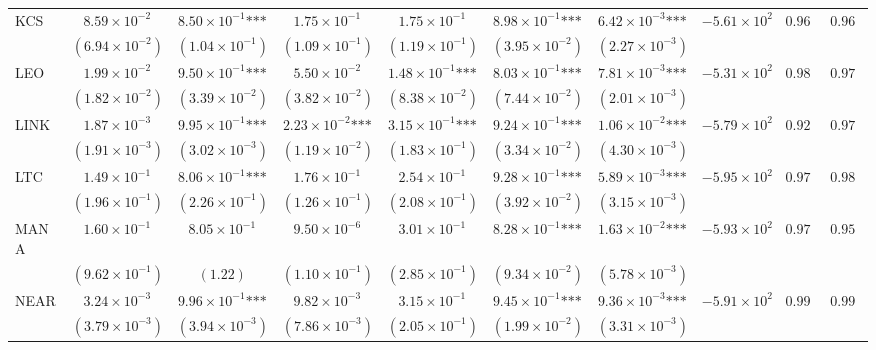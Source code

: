\documentclass{article}
\begin{document}
\begin{landscape}
\begin{longtable}{lccccccccc}
KCS & $8.59\times 10^{-2}$ & $8.50\times 10^{-1}\text{***}$ & $1.75\times 10^{-1}$ & $1.75\times 10^{-1}$ & $8.98\times 10^{-1}\text{***}$ & $6.42\times 10^{-3}\text{***}$ & $-5.61\times 10^{2}$ & $0.965$ & $0.968$ \\
 & $(6.94\times 10^{-2})$ & $(1.04\times 10^{-1})$ & $(1.09\times 10^{-1})$ & $(1.19\times 10^{-1})$ & $(3.95\times 10^{-2})$ & $(2.27\times 10^{-3})$ &  &  &  \\
LEO & $1.99\times 10^{-2}$ & $9.50\times 10^{-1}\text{***}$ & $5.50\times 10^{-2}$ & $1.48\times 10^{-1}\text{***}$ & $8.03\times 10^{-1}\text{***}$ & $7.81\times 10^{-3}\text{***}$ & $-5.31\times 10^{2}$ & $0.986$ & $0.979$ \\
 & $(1.82\times 10^{-2})$ & $(3.39\times 10^{-2})$ & $(3.82\times 10^{-2})$ & $(8.38\times 10^{-2})$ & $(7.44\times 10^{-2})$ & $(2.01\times 10^{-3})$ &  &  &  \\
LINK & $1.87\times 10^{-3}$ & $9.95\times 10^{-1}\text{***}$ & $2.23\times 10^{-2}\text{***}$ & $3.15\times 10^{-1}\text{***}$ & $9.24\times 10^{-1}\text{***}$ & $1.06\times 10^{-2}\text{***}$ & $-5.79\times 10^{2}$ & $0.928$ & $0.973$ \\
 & $(1.91\times 10^{-3})$ & $(3.02\times 10^{-3})$ & $(1.19\times 10^{-2})$ & $(1.83\times 10^{-1})$ & $(3.34\times 10^{-2})$ & $(4.30\times 10^{-3})$ &  &  &  \\
LTC & $1.49\times 10^{-1}$ & $8.06\times 10^{-1}\text{***}$ & $1.76\times 10^{-1}$ & $2.54\times 10^{-1}$ & $9.28\times 10^{-1}\text{***}$ & $5.89\times 10^{-3}\text{***}$ & $-5.95\times 10^{2}$ & $0.979$ & $0.984$ \\
 & $(1.96\times 10^{-1})$ & $(2.26\times 10^{-1})$ & $(1.26\times 10^{-1})$ & $(2.08\times 10^{-1})$ & $(3.92\times 10^{-2})$ & $(3.15\times 10^{-3})$ &  &  &  \\
MANA & $1.60\times 10^{-1}$ & $8.05\times 10^{-1}$ & $9.50\times 10^{-6}$ & $3.01\times 10^{-1}$ & $8.28\times 10^{-1}\text{***}$ & $1.63\times 10^{-2}\text{***}$ & $-5.93\times 10^{2}$ & $0.974$ & $0.957$ \\
 & $(9.62\times 10^{-1})$ & $(1.22)$ & $(1.10\times 10^{-1})$ & $(2.85\times 10^{-1})$ & $(9.34\times 10^{-2})$ & $(5.78\times 10^{-3})$ &  &  &  \\
NEAR & $3.24\times 10^{-3}$ & $9.96\times 10^{-1}\text{***}$ & $9.82\times 10^{-3}$ & $3.15\times 10^{-1}$ & $9.45\times 10^{-1}\text{***}$ & $9.36\times 10^{-3}\text{***}$ & $-5.91\times 10^{2}$ & $0.998$ & $0.997$ \\
 & $(3.79\times 10^{-3})$ & $(3.94\times 10^{-3})$ & $(7.86\times 10^{-3})$ & $(2.05\times 10^{-1})$ & $(1.99\times 10^{-2})$ & $(3.31\times 10^{-3})$ &  &  &  \\

\end{longtable}
\end{landscape}
\end{document}
